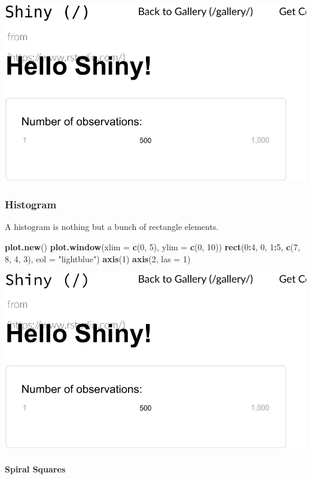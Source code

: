 \documentclass[]{book}
\newenvironment{Shaded}{\begin{snugshade}}{\end{snugshade}}
\newcommand{\DataTypeTok}[1]{\textcolor[rgb]{0.13,0.29,0.53}{#1}}
\newcommand{\DecValTok}[1]{\textcolor[rgb]{0.00,0.00,0.81}{#1}}
\newcommand{\KeywordTok}[1]{\textcolor[rgb]{0.13,0.29,0.53}{\textbf{#1}}}
\newcommand{\NormalTok}[1]{#1}
\newcommand{\OperatorTok}[1]{\textcolor[rgb]{0.81,0.36,0.00}{\textbf{#1}}}
\newcommand{\StringTok}[1]{\textcolor[rgb]{0.31,0.60,0.02}{#1}}
\let\oldparagraph\paragraph
\renewcommand{\paragraph}[1]{\oldparagraph{#1}\mbox{}}
\theoremstyle{definition}
\theoremstyle{definition}
\theoremstyle{definition}
\theoremstyle{remark}
\begin{document}
\includegraphics[width=0.5\linewidth]{Rcourse_files/figure-latex/unnamed-chunk-263-1}

\hypertarget{histogram}{%
\subsubsection{Histogram}\label{histogram}}

A histogram is nothing but a bunch of rectangle elements.

\begin{Shaded}
\begin{Highlighting}[]
\KeywordTok{plot.new}\NormalTok{()}
\KeywordTok{plot.window}\NormalTok{(}\DataTypeTok{xlim =} \KeywordTok{c}\NormalTok{(}\DecValTok{0}\NormalTok{, }\DecValTok{5}\NormalTok{), }\DataTypeTok{ylim =} \KeywordTok{c}\NormalTok{(}\DecValTok{0}\NormalTok{, }\DecValTok{10}\NormalTok{))}
\KeywordTok{rect}\NormalTok{(}\DecValTok{0}\OperatorTok{:}\DecValTok{4}\NormalTok{, }\DecValTok{0}\NormalTok{, }\DecValTok{1}\OperatorTok{:}\DecValTok{5}\NormalTok{, }\KeywordTok{c}\NormalTok{(}\DecValTok{7}\NormalTok{, }\DecValTok{8}\NormalTok{, }\DecValTok{4}\NormalTok{, }\DecValTok{3}\NormalTok{), }\DataTypeTok{col =} \StringTok{"lightblue"}\NormalTok{)}
\KeywordTok{axis}\NormalTok{(}\DecValTok{1}\NormalTok{)}
\KeywordTok{axis}\NormalTok{(}\DecValTok{2}\NormalTok{, }\DataTypeTok{las =} \DecValTok{1}\NormalTok{)}
\end{Highlighting}
\end{Shaded}

\includegraphics[width=0.5\linewidth]{Rcourse_files/figure-latex/unnamed-chunk-264-1}

\hypertarget{spiral-squares}{%
\paragraph{Spiral Squares}\label{spiral-squares}}
\end{document}
